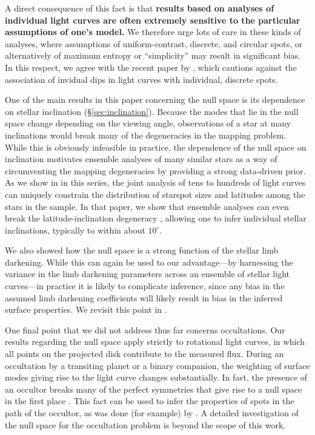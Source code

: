\documentclass[modern]{aastex62}
\begin{document}
A direct consequence of this fact is that \textbf{results based on analyses
    of individual light curves are often extremely sensitive to
    the particular assumptions of one's model.} We therefore urge lots of care
in these kinds of analyses, where assumptions of uniform-contrast, discrete, and
circular spots, or alternatively of maximum entropy or ``simplicity'' may
result in significant bias. In this respect, we agree with the recent
paper by \citet{Basri2020}, which cautions against the association of
invidual dips in light curves with individual, discrete spots.

One of the main results in this paper concerning the null space is its
dependence on stellar inclination (\S\ref{sec:inclination}).
Because the modes that lie in the null
space change depending on the viewing angle, observations of a star at many
inclinations would break many of the degeneracies in the mapping problem. While
this is obviously infeasible in practice, the dependence of the null
space on inclination motivates ensemble analyses of many similar stars
as a way of circumventing the mapping degeneracies by
providing a strong data-driven prior. As we show in
 in this series, the joint analysis of tens to hundreds
of light curves can uniquely constrain the distribution of starspot
sizes and latitudes among the stars in the sample. In that paper,
we show that ensemble analyses can
even break the latitude-inclination degeneracy \citep[e.g.,][]{Walkowicz2013},
allowing one to infer individual stellar inclinations, typically to within
about $10^\circ$.

We also showed how the null space is a strong function of the stellar limb
darkening. While this can again be used to our advantage---by harnessing the
variance in the limb darkening parameters across an ensemble of stellar
light curves---in practice it is likely to complicate inference, since
any bias in the assumed limb darkening coefficients will likely result in
bias in the inferred surface properties. We revisit this point in
.

One final point that we did not address thus far concerns occultations.
Our results regarding the null space apply strictly to rotational light curves,
in which all points on the projected disk contribute to the measured flux.
During an occultation by a transiting planet or a binary companion, the
weighting of surface modes giving rise to the light curve changes
substantially. In fact, the presence of an occultor breaks many of the perfect
symmetries that give rise to a null space in the first place
\citep[e.g.,][]{Luger2019}. This fact can be used to infer the properties
of spots in the path of the occultor, as was done (for example)
by \citet[e.g.,][]{Morris2017}. A detailed investigation of the null space
for the occultation problem is beyond the scope of this work.
\end{document}
